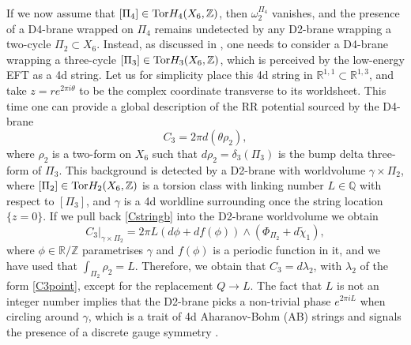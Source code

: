 \documentclass[11pt]{article}
\def\be{\begin{equation}}
\def\ee{\end{equation}}
\def\g {{\gamma}}
\newcommand{\IR}{\mathbb{R}}
\newcommand{\IZ}{\mathbb{Z}}
\begin{document}
If we now assume that $[\Pi_4] \in {\rm Tor}H_4(X_6, \IZ)$, then $\omega_2^{\Pi_4}$ vanishes, and the presence of a D4-brane wrapped on $\Pi_4$ remains undetected by any D2-brane wrapping a two-cycle $\Pi_2 \subset X_6$. Instead, as discussed in \cite{Camara:2011jg}, one needs to consider a D4-brane wrapping  a three-cycle $[\Pi_3] \in {\rm Tor}H_3(X_6, \IZ)$, which is perceived by the low-energy EFT as a 4d string. Let us for simplicity place this 4d string in $\IR^{1,1} \subset \IR^{1,3}$, and take $z = r e^{2\pi i \theta}$ to be the complex coordinate transverse to its worldsheet. This time one can provide a global description of the RR potential sourced by the D4-brane
\be
C_{3} = 2\pi d \left( \theta \rho_{2} \right) ,
\label{Cstringb}
\ee
where $\rho_2$ is a two-form on $X_6$ such that $d\rho_2 = \delta_3(\Pi_3)$ is the bump delta three-form of $\Pi_3$. This background is detected by a D2-brane with worldvolume $\g \times\Pi_2$, where $[\Pi_2] \in  {\rm Tor} H_2(X_6, \IZ)$ is a torsion class with linking number $L \in \mathbb{Q}$ with respect to $[\Pi_3]$, and $\gamma$ is a 4d worldline surrounding once the string location $\{z=0\}$. If we pull back \eqref{Cstringb} into the D2-brane worldvolume we obtain
\be
C_{3}|_{\g \times \Pi_{2}} = 2\pi L \left( d\phi + df(\phi) \right) \wedge \left(\Phi_{\Pi_{2}} + d\tilde{\chi}_{1}\right)  ,
\label{pullC74d}
\ee
where $\phi \in \IR/ \IZ$ parametrises $\gamma$ and $f(\phi)$ is a periodic function in it, and we have used that $\int_{\Pi_{2}} \rho_{2} = L$. Therefore, we obtain that  $C_{3} = d\lambda_2$, with $\lambda_{2}$ of the form \eqref{C3point}, except for the replacement $Q \to L$. The fact that $L$ is not an integer number implies that the D2-brane picks a non-trivial phase $e^{2\pi i L}$ when circling around $\gamma$, which is a trait of 4d Aharanov-Bohm (AB) strings and signals the presence of a discrete gauge symmetry \cite{Banks:2010zn}. 
\end{document}
